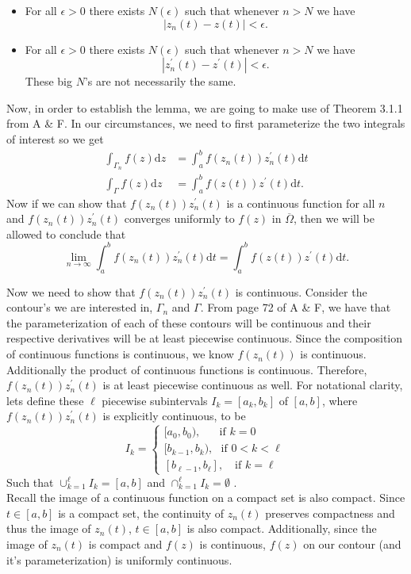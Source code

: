 \documentclass[10pt]{amsart}
\newcommand{\D}{\mathrm{d}}
\theoremstyle{nonumberplain}
\begin{document}
\begin{enumerate}[label={\bf {\arabic*}:}]
\begin{itemize}
\begin{itemize}
\item For all $\epsilon > 0$ there exists $N(\epsilon)$ such that whenever $n > N$ we have $$|z_n(t) - z(t)| < \epsilon.$$
\item For all $\epsilon > 0$ there exists $N(\epsilon)$ such that whenever $n > N$ we have $$|z_n^\prime(t) - z^\prime(t)| < \epsilon.$$
These big $N$'s are not necessarily the same.
\end{itemize}
\end{itemize}
Now, in order to establish the lemma, we are going to make use of Theorem 3.1.1 from A \& F.
In our circumstances, we need to first parameterize the two integrals of interest so we get
\begin{align*}
\int_{\Gamma_n}  f(z) \D z &= \int_a^b  f(z_n(t))z_n^\prime(t) \D t \\
\int_{\Gamma}  f(z) \D z &= \int_a^b  f(z(t))z^\prime(t) \D t.
\end{align*}
Now if we can show that $f(z_n(t))z_n^\prime(t)$ is a continuous function for all $n$ and $f(z_n(t))z_n^\prime(t)$ converges uniformly to $f(z)$ in $\overline \Omega$, then we will be allowed to conclude that
$$
\lim_{n\rightarrow\infty} \int_a^b  f(z_n(t))z_n^\prime(t) \D t = \int_a^b  f(z(t))z^\prime(t) \D t.
$$

\noindent
Now we need to show that $f(z_n(t))z_n^\prime(t)$ is continuous.
Consider the contour's we are interested in, $\Gamma_n$ and $\Gamma$.
From page 72 of A \& F, we have that the parameterization of each of these contours will be continuous and their respective derivatives will be at least piecewise continuous.
Since the composition of continuous functions is continuous, we know $f(z_n(t))$ is continuous.
Additionally the product of continuous functions is continuous.
Therefore, $f(z_n(t))z_n^\prime(t)$ is at least piecewise continuous as well.
For notational clarity, lets define these $\ell$ piecewise subintervals $I_k = [a_k, b_k]$ of $[a,b]$, where $f(z_n(t))z_n^\prime(t)$ is explicitly continuous, to be
$$
I_k = \begin{cases}
[a_0, b_0), \quad \:\:\: \text{if } k = 0 \\
[b_{k - 1}, b_k), \:\:\: \text{if } 0 < k < \ell \\
[b_{\ell - 1}, b_\ell], \quad \text{if } k = \ell
\end{cases}
$$
Such that $\cup_{k=1}^\ell I_k = [a, b]$ and $\cap_{k=1}^\ell I_k = \emptyset$ .
\\

\noindent
Recall the image of a continuous function on a compact set is also compact.
Since $t \in [a, b]$ is a compact set, the continuity of $z_n(t)$ preserves compactness and thus the image of $z_n(t)$, $t \in [a, b]$ is also compact.
Additionally, since the image of $z_n(t)$ is compact and $f(z)$ is continuous, $f(z)$ on our contour (and it's parameterization) is uniformly continuous. \\


\end{enumerate}
\end{document}
